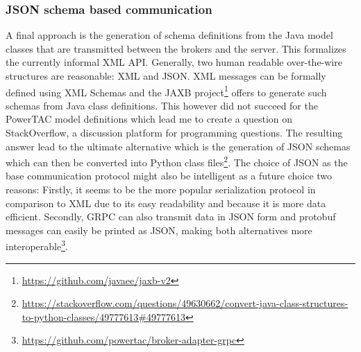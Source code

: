 \subsubsection{JSON schema based communication}%
\label{sub:json_schema_based_communication}


A final approach is the generation of schema definitions from the Java model classes that are transmitted between the
brokers and the server. This formalizes the currently informal \ac{XML} \ac{API}. Generally, two human readable over-the-wire structures are reasonable: \ac{XML} and \ac{JSON}.
\ac{XML} messages can be formally defined using \ac{XML} Schemas and the \ac{JAXB} project\footnote{\url{https://github.com/javaee/jaxb-v2}} offers to generate such schemas from Java class definitions. This
however did not succeed for the \ac{PowerTAC} model definitions which lead me to create a question on StackOverflow, a
discussion platform for programming questions. The resulting answer lead to the ultimate alternative which is the
generation of \ac{JSON} schemas which can then be converted into Python class files\footnote{\url{https://stackoverflow.com/questions/49630662/convert-java-class-structures-to-python-classes/49777613\#49777613}}.
The choice of \ac{JSON} as the base communication protocol might also be intelligent as a future choice two reasons:
Firstly, it seems to be the more popular serialization protocol in comparison to \ac{XML} \citep{jsonxml} due to its
easy readability and because it is more data efficient. Secondly, \ac{GRPC} can also transmit data in \ac{JSON} form
and protobuf messages can easily be printed as \ac{JSON}, making both alternatives more interoperable\footnote{\url{https://github.com/powertac/broker-adapter-grpc} }.


